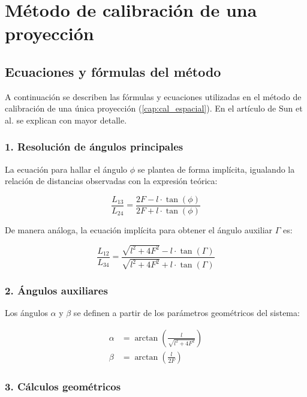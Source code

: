 \label{apendice_A}

\chapter{Método de calibración de una proyección}

\section*{Ecuaciones y fórmulas del método}

A continuación se describen las fórmulas y ecuaciones utilizadas en el método de calibración
de una única proyección (\ref{cap:cal_espacial}). En el artículo de Sun et al. \cite{Sun2006}
se explican con mayor detalle.

\subsection*{1. Resolución de ángulos principales}

La ecuación para hallar el ángulo $\phi$ se plantea de forma implícita, igualando la relación de distancias observadas con la expresión teórica:

\begin{equation}
\frac{L_{13}}{L_{24}} = \frac{2F - l\cdot \tan(\phi)}{2F + l\cdot \tan(\phi)}
\end{equation}

De manera análoga, la ecuación implícita para obtener el ángulo auxiliar $\Gamma$ es:

\begin{equation}
\frac{L_{12}}{L_{34}} = \frac{\sqrt{l^2 + 4F^2} - l\cdot \tan(\Gamma)}{\sqrt{l^2 + 4F^2} + l\cdot \tan(\Gamma)}
\end{equation}

\subsection*{2. Ángulos auxiliares}

Los ángulos $\alpha$ y $\beta$ se definen a partir de los parámetros geométricos del sistema:

\begin{align}
\alpha &= \arctan\left(\frac{l}{\sqrt{l^2 + 4F^2}}\right) \\
\beta &= \arctan\left(\frac{l}{2F}\right)
\end{align}

\subsection*{3. Cálculos geométricos}

